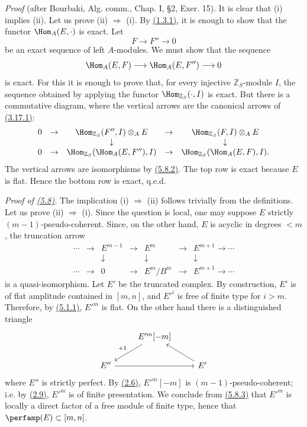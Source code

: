 \emph{Proof} (after Bourbaki, Alg. comm., Chap. I, §2, Exer. 15). It is clear that (i) implies (ii). Let us prove (ii) \(\Rightarrow\) (i). By \hyperlink{sga6.e01.lem.1-3-1}{(1.3.1)}, it is enough to show that the functor \(\Hom_A(E,\cdot)\) is exact. Let
\[
  F\longrightarrow F''\longrightarrow 0
\]
be an exact sequence of left \(A\)-modules. We must show that the sequence
\[
  \Hom_A(E,F)\longrightarrow \Hom_A(E,F'')\longrightarrow 0
\]
is exact. For this it is enough to prove that, for every injective \(\mathbb Z_S\)-module \(I\), the sequence obtained by applying the functor \(\Hom_{\mathbb Z_S}(\cdot,I)\) is exact. But there is a commutative diagram, where the vertical arrows are the canonical arrows of \hyperlink{sga6.e01.eq.5-8-2-1}{(3.17.1)}:
\[
\begin{array}{ccccccccc}
0&\to&\Hom_{\mathbb Z_S}(F'',I)\otimes_A E&\to&\Hom_{\mathbb Z_S}(F,I)\otimes_A E\\
&&\downarrow&&\downarrow\\
0&\to&\Hom_{\mathbb Z_S}(\Hom_A(E,F''),I)&\to&\Hom_{\mathbb Z_S}(\Hom_A(E,F),I).
\end{array}
\]
The vertical arrows are isomorphisms by \hyperlink{sga6.e01.lem.5-8-2}{(5.8.2)}. The top row is exact because \(E\) is flat. Hence the bottom row is exact, q.e.d.

\emph{Proof of \hyperlink{sga6.e01.thm.5-8}{(5.8)}.} The implication (i) \(\Rightarrow\) (ii) follows trivially from the definitions. Let us prove (ii) \(\Rightarrow\) (i). Since the question is local, one may suppose \(E\) strictly \((m-1)\)-pseudo-coherent. Since, on the other hand, \(E\) is acyclic in degrees \(<m\), the truncation arrow
\[
\begin{array}{ccccccc}
\cdots&\to&E^{m-1}&\to&E^m&\to&E^{m+1}\to\cdots\\
&&\downarrow&&\downarrow&&\downarrow\\
\cdots&\to&0&\to&E^m/B^m&\to&E^{m+1}\to\cdots
\end{array}
\]
is a quasi-isomorphism. Let \(E'\) be the truncated complex. By construction, \(E'\) is of flat amplitude contained in \([m,n]\), and \(E'^i\) is free of finite type for \(i>m\). Therefore, by \hyperlink{sga6.e01.lem.5-1-1}{(5.1.1)}, \(E'^m\) is flat. On the other hand there is a distinguished triangle
\[
\begin{tikzcd}
& E'^m[-m] \arrow[dl,"+1"'] & \\
E'' \arrow[rr] && E' \arrow[ul]
\end{tikzcd}
\]
where \(E''\) is strictly perfect. By \hyperlink{sga6.e01.schol.2-6}{(2.6)}, \(E'^m[-m]\) is \((m-1)\)-pseudo-coherent; i.e. by \hyperlink{sga6.e01.prop.2-9}{(2.9)}, \(E'^m\) is of finite presentation. We conclude from \hyperlink{sga6.e01.lem.5-8-3}{(5.8.3)} that \(E'^m\) is locally a direct factor of a free module of finite type, hence that \(\perfamp(E)\subset[m,n]\).

